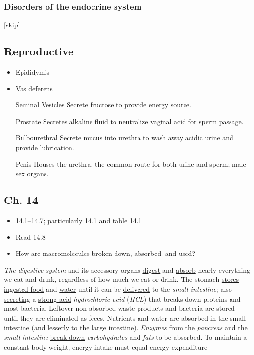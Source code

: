 \documentclass[11pt]{article}
\begin{document}
\subsubsection{Disorders of the endocrine system}
\label{sec:org1cb1052}
[skip]
\subsection{Reproductive}
\label{sec:org0d69138}
\begin{itemize}
\item Epididymis
\item Vas deferens
\item[{Seminal Vesicles}] Secrete fructose to provide energy source.
\item[{Prostate}] Secretes alkaline fluid to neutralize vaginal acid for sperm passage.
\item[{Bulbourethral}] Secrete mucus into urethra to wash away acidic urine and
provide lubrication.
\item[{Penis}] Houses the urethra, the common route for both urine and sperm; male
sex organs.
\end{itemize}

\subsection{Ch. 14}
\label{sec:org14171ba}
\begin{itemize}
\item 14.1--14.7; particularly 14.1 and table 14.1
\item Read 14.8
\item How are macromolecules broken down, absorbed, and used?
\end{itemize}

\emph{The digestive system} and its accessory organs \uline{digest} and \uline{absorb} nearly
everything we eat and drink, regardless of how much we eat or drink. The stomach
\uline{stores ingested food} and \uline{water} until it can be \uline{delivered} to the \emph{small intestine};
also \uline{secreting} a \uline{strong acid} \emph{hydrochloric acid} (\emph{HCL}) that breaks down proteins
and most bacteria. Leftover non-absorbed waste products and bacteria are stored
until they are eliminated as feces. Nutrients and water are absorbed in the
small intestine (and lesserly to the large intestine). \emph{Enzymes} from the \emph{pancreas}
and the \emph{small intestine} \uline{break down} \emph{carbohydrates} and \emph{fats} to be absorbed. To
maintain a constant body weight, energy intake must equal energy expenditure.
\end{document}
